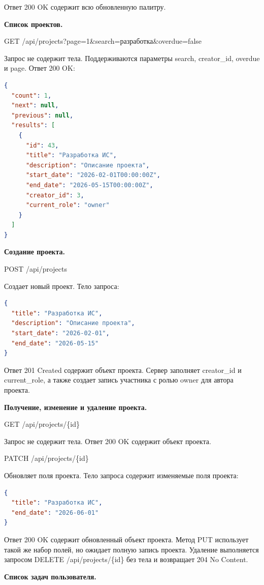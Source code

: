 Ответ 200 OK содержит всю обновленную палитру.

\textbf{Список проектов.}

GET /api/projects?page=1\&search=разработка\&overdue=false

Запрос не содержит тела. Поддерживаются параметры search, creator\_id, overdue и page. Ответ 200 OK:

\begin{lstlisting}[numbers=none, language=json]
{
  "count": 1,
  "next": null,
  "previous": null,
  "results": [
    {
      "id": 43,
      "title": "Разработка ИС",
      "description": "Описание проекта",
      "start_date": "2026-02-01T00:00:00Z",
      "end_date": "2026-05-15T00:00:00Z",
      "creator_id": 3,
      "current_role": "owner"
    }
  ]
}
\end{lstlisting}


\textbf{Создание проекта.}

POST /api/projects

Создает новый проект. Тело запроса:

\begin{lstlisting}[numbers=none, language=json]
{
  "title": "Разработка ИС",
  "description": "Описание проекта",
  "start_date": "2026-02-01",
  "end_date": "2026-05-15"
}
\end{lstlisting}


Ответ 201 Created содержит объект проекта. Сервер заполняет creator\_id и current\_role, а также создает запись участника с ролью owner для автора проекта.

\textbf{Получение, изменение и удаление проекта.}

GET /api/projects/\{id\}

Запрос не содержит тела. Ответ 200 OK содержит объект проекта.

PATCH /api/projects/\{id\}

Обновляет поля проекта. Тело запроса содержит изменяемые поля проекта:

\begin{lstlisting}[numbers=none, language=json]
{
  "title": "Разработка ИС",
  "end_date": "2026-06-01"
}
\end{lstlisting}


Ответ 200 OK содержит обновленный объект проекта. Метод PUT использует такой же набор полей, но ожидает полную запись проекта. Удаление выполняется запросом DELETE /api/projects/\{id\} без тела и возвращает 204 No Content.

\textbf{Список задач пользователя.}

